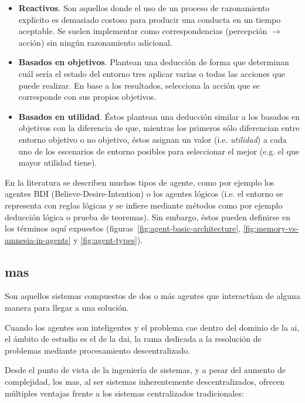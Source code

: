 \begin{itemize}
	\item \textbf{Reactivos}. Son aquellos donde el uso de un proceso de razonamiento explícito es demasiado costoso para producir una conducta en un tiempo aceptable. Se suelen implementar como correspondencias (percepción $\rightarrow$ acción) sin ningún razonamiento adicional.
	\item \textbf{Basados en objetivos}. Plantean una deducción de forma que determinan cuál sería el estado del entorno tres aplicar varias o todas las acciones que puede realizar. En base a los resultados, selecciona la acción que se corresponde con sus propios objetivos.
	\item \textbf{Basados en utilidad}. Éstos plantean una deducción similar a los basados en objetivos con la diferencia de que, mientras los primeros sólo diferencian entre entorno objetivo o no objetivo, éstos asignan un valor (i.e. \textit{utilidad}) a cada uno de los escenarios de entorno posibles para seleccionar el mejor (e.g. el que mayor utilidad tiene).
\end{itemize}

En la literatura se describen muchos tipos de agente, como por ejemplo los agentes BDI (Believe-Desire-Intention) o los agentes lógicos (i.e. el entorno se representa con reglas lógicas y se infiere mediante métodos como por ejemplo deducción lógica o prueba de teoremas). Sin embargo, éstos pueden definirse en los términos aquí expuestos (figuras~\ref{fig:agent-basic-architecture}, \ref{fig:memory-vs-amnesia-in-agents} y \ref{fig:agent-types}). 

\subsection{\gls{mas}}

Son aquellos sistemas compuestos de dos o más agentes que interactúan de alguna manera para llegar a una solución.

Cuando los agentes son inteligentes y el problema cae dentro del dominio de la \gls{ai}, el ámbito de estudio es el de la \gls{dai}, la rama dedicada a la resolución de problemas mediante procesamiento descentralizado.

Desde el punto de vista de la ingeniería de sistemas, y a pesar del aumento de complejidad, los \gls{mas}, al ser sistemas inherentemente descentralizados, ofrecen múltiples ventajas frente a los sistemas centralizados tradicionales:

